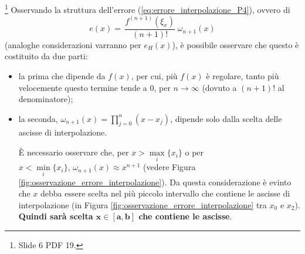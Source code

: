\begin{remark}\label{rem:consErrInterP4}\footnote{Slide 6 PDF 19.}
    Osservando la struttura dell'errore (\ref{eq:errore_interpolazione_P4}), ovvero di
    \begin{equation*}
        e(x)=\,\boxed{\boxed{\frac{f^{(n+1)}(\xi_x)}{(n+1)!}}\;\boxed{\omega_{n+1}(x)}}
    \end{equation*}
    (analoghe considerazioni varranno per $e_H(x)$), è possibile osservare che questo è costituito da due parti:
    \begin{itemize}
    	\item la prima che dipende da $\boxed{f(x)}$, per cui, più $f(x)$ è regolare, tanto più velocemente questo termine tende a 0, per $n\rightarrow\infty$ (dovuto a $(n+1)!$ al denominatore);
    	\item la seconda, $\boxed{\omega_{n+1}(x)=\prod_{j=0}^n(x-x_j)}$, dipende solo dalla scelta delle ascisse di interpolazione.
    	
    	È necessario osservare che, per $x>\underset{i}{\max}\{x_i\}$ o per $x<\underset{i}{\min}\{x_i\},\, \omega_{n+1}(x)\approx x^{n+1}$ (vedere Figura \ref{fig:osservazione_errore_interpolazione}). Da questa considerazione è evinto che $x$ debba essere scelta nel più piccolo intervallo che contiene le ascisse di interpolazione (in Figura \ref{fig:osservazione_errore_interpolazione} tra $x_0$ e $x_2$). \textbf{Quindi sarà scelta $\boldsymbol{x\in [a,b]}$ che contiene le ascisse}.
    \end{itemize}
\end{remark}


